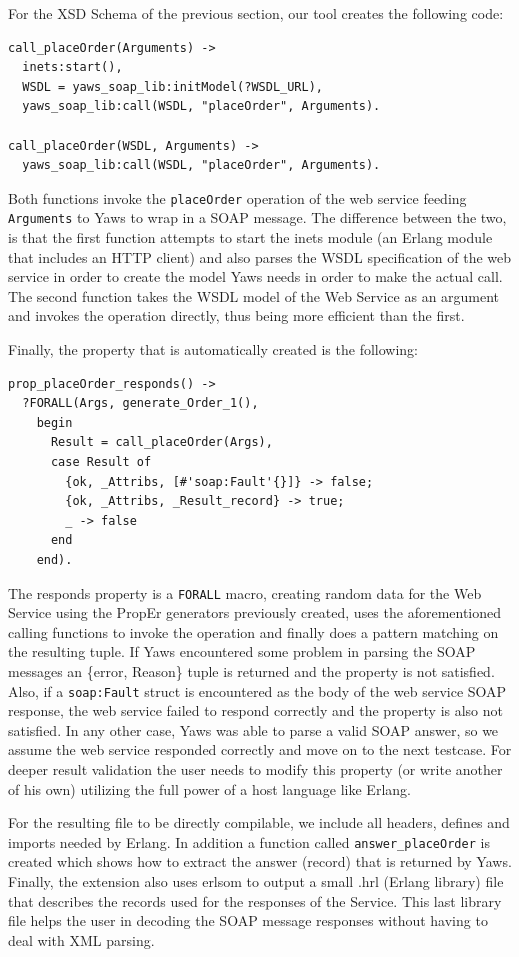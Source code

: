 \documentclass[submission,copyright]{eptcs}
\begin{document}
For the XSD Schema of the previous section, our tool creates the following code:
\begin{lstlisting}
call_placeOrder(Arguments) ->
  inets:start(),
  WSDL = yaws_soap_lib:initModel(?WSDL_URL),
  yaws_soap_lib:call(WSDL, "placeOrder", Arguments).
    
call_placeOrder(WSDL, Arguments) ->
  yaws_soap_lib:call(WSDL, "placeOrder", Arguments).
\end{lstlisting}
Both functions invoke the \texttt{placeOrder} operation of the
web service feeding \texttt{Arguments} to Yaws to wrap in a SOAP
message. The difference between the two, is that the first function
attempts to start the inets module (an Erlang module that includes an
HTTP client) and also parses the WSDL specification of the web service
in order to create the model Yaws needs in order to make the actual
call. The second function takes the WSDL model of the Web Service as
an argument and invokes the operation directly, thus being more
efficient than the first.

Finally, the property that is automatically created is the following:

\begin{lstlisting}
prop_placeOrder_responds() ->
  ?FORALL(Args, generate_Order_1(),
    begin
      Result = call_placeOrder(Args),
      case Result of 
        {ok, _Attribs, [#'soap:Fault'{}]} -> false;
        {ok, _Attribs, _Result_record} -> true;
        _ -> false
      end
    end).
\end{lstlisting}

The responds property is a \texttt{FORALL} macro, creating random data for the Web Service using 
the PropEr generators previously created, uses the aforementioned calling functions to 
invoke the operation and finally does a pattern matching on the resulting tuple. If Yaws 
encountered some problem in parsing the SOAP messages an \{error, Reason\} tuple is returned
and the property is not satisfied. Also, if a \texttt{soap:Fault} struct is encountered as the 
body of the web service SOAP response, the web service failed to respond correctly and the 
property is also not satisfied. In any other case, Yaws was able to parse a valid SOAP answer, 
so we assume the web service responded correctly and move on to the next testcase. For deeper
result validation the user needs to modify this property (or write another of his own) utilizing
the full power of a host language like Erlang.

For the resulting file to be directly compilable, we include all headers, defines and imports 
needed by Erlang. In addition a function called \texttt{answer\_placeOrder} is created which 
shows how to extract the answer (record) that is returned by Yaws. Finally, the extension also 
uses erlsom to output a small .hrl (Erlang library) file that describes the records used for the 
responses of the Service. This last library file helps the user in decoding the SOAP message 
responses without having to deal with XML parsing.
\end{document}
